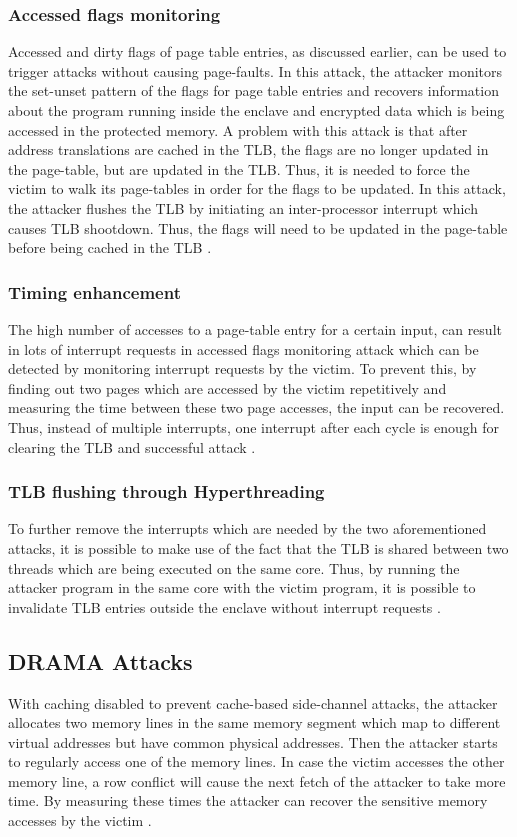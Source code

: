\subsubsection{Accessed flags monitoring}
Accessed and dirty flags of page table entries, as discussed earlier, can be used to trigger attacks without causing page-faults. In this attack, the attacker monitors the set-unset pattern of the flags for page table entries and recovers information about the program running inside the enclave and encrypted data which is being accessed in the protected memory. A problem with this attack is that after address translations are cached in the TLB, the flags are no longer updated in the page-table, but are updated in the TLB. Thus, it is needed to force the victim to walk its page-tables in order for the flags to be updated. In this attack, the attacker flushes the TLB by initiating an inter-processor interrupt which causes TLB shootdown. Thus, the flags will need to be updated in the page-table before being cached in the TLB \cite{leakycauldron,stealthy}.
\subsubsection{Timing enhancement}
The high number of accesses to a page-table entry for a certain input, can result in lots of interrupt requests in accessed flags monitoring attack which can be detected by monitoring interrupt requests by the victim. To prevent this, by finding out two pages which are accessed by the victim repetitively and measuring the time between these two page accesses, the input can be recovered. Thus, instead of multiple interrupts, one interrupt after each cycle is enough for clearing the TLB and successful attack \cite{leakycauldron,stealthy}.
\subsubsection{TLB flushing through Hyperthreading}
To further remove the interrupts which are needed by the two aforementioned attacks, it is possible to make use of the fact that the TLB is shared between two threads which are being executed on the same core. Thus, by running the attacker program in the same core with the victim program, it is possible to invalidate TLB entries outside the enclave without interrupt requests \cite{leakycauldron,stealthy}.

\subsection{DRAMA Attacks}
With caching disabled to prevent cache-based side-channel attacks, the attacker allocates two memory lines in the same memory segment which map to different virtual addresses but have common physical addresses. Then the attacker starts to regularly access one of the memory lines. In case the victim accesses the other memory line, a row conflict will cause the next fetch of the attacker to take more time. By measuring these times the attacker can recover the sensitive memory accesses by the victim \cite{leakycauldron,drama}.

